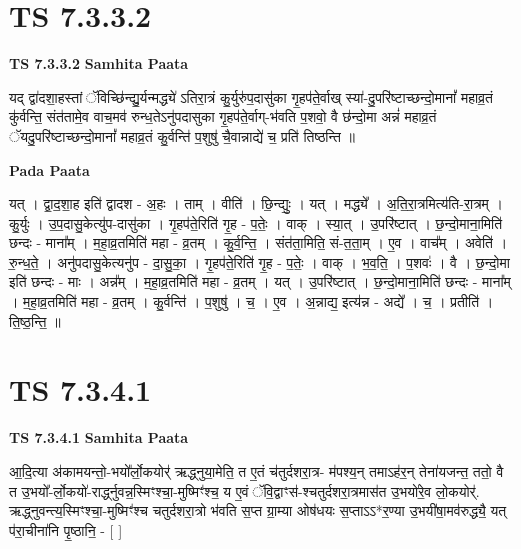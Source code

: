 \documentclass[17pt]{extarticle}
\begin{document}

\section{ TS 7.3.3.2 }

\textbf{TS 7.3.3.2 } \newline
\textbf{Samhita Paata} \newline

यद् द्वा॑दशा॒हस्तां ॅविच्छि॑न्द्यु॒र्यन्मद्ध्ये॑ ऽतिरा॒त्रं कु॒र्युरु॑प॒दासु॑का गृ॒हप॑ते॒र्वाख् स्या॑-दु॒परि॑ष्टाच्छन्दो॒मानां᳚ महाव्र॒तं कु॑र्वन्ति॒ संत॑तामे॒व वाच॒मव॑ रुन्ध॒तेऽनु॑पदासुका गृ॒हप॑ते॒र्वाग्-भ॑वति प॒शवो॒ वै छ॑न्दो॒मा अन्नं॑ महाव्र॒तं ॅयदु॒परि॑ष्टाच्छन्दो॒मानां᳚ महाव्र॒तं कु॒र्वन्ति॑ प॒शुषु॑ चै॒वान्नाद्ये॑ च॒ प्रति॑ तिष्ठन्ति ॥ \newline

\textbf{Pada Paata} \newline

यत् । द्वा॒द॒शा॒ह इति॑ द्वादश - अ॒हः । ताम् । वीति॑ । छि॒न्द्युः॒ । यत् । मद्ध्ये᳚ । अ॒ति॒रा॒त्रमित्य॑ति-रा॒त्रम् । कु॒र्युः । उ॒प॒दासु॒केत्यु॑प-दासु॑का । गृ॒हप॑ते॒रिति॑ गृ॒ह - प॒तेः॒ । वाक् । स्या॒त् । उ॒परि॑ष्टात् । छ॒न्दो॒माना॒मिति॑ छन्दः - माना᳚म् । म॒हा॒व्र॒तमिति॑ महा - व्र॒तम् । कु॒र्व॒न्ति॒ । संत॑ता॒मिति॒ सं-त॒ता॒म् । ए॒व । वाच᳚म् । अवेति॑ । रु॒न्ध॒ते॒ । अनु॑पदासु॒केत्यनु॑प - दा॒सु॒का॒ । गृ॒हप॑ते॒रिति॑ गृ॒ह - प॒तेः॒ । वाक् । भ॒व॒ति॒ । प॒शवः॑ । वै । छ॒न्दो॒मा इति॑ छन्दः - माः । अन्न᳚म् । म॒हा॒व्र॒तमिति॑ महा - व्र॒तम् । यत् । उ॒परि॑ष्टात् । छ॒न्दो॒माना॒मिति॑ छन्दः - माना᳚म् । म॒हा॒व्र॒तमिति॑ महा - व्र॒तम् । कु॒र्वन्ति॑ । प॒शुषु॑ । च॒ । ए॒व । अ॒न्नाद्य॒ इत्य॑न्न - अद्ये᳚ । च॒ । प्रतीति॑ । ति॒ष्ठ॒न्ति॒ ॥  \newline





\section{ TS 7.3.4.1 }

\textbf{TS 7.3.4.1 } \newline
\textbf{Samhita Paata} \newline

आ॒दि॒त्या अ॑कामयन्तो॒-भयो᳚र्लो॒कयोर्॑ ऋद्ध्नुया॒मेति॒ त ए॒तं च॑तुर्दशरा॒त्र- म॑पश्य॒न् तमाऽह॑र॒न् तेना॑यजन्त॒ ततो॒ वै त उ॒भयो᳚-र्लो॒कयो॑-रार्द्ध्नुवन्न॒स्मिꣳश्चा॒-मुष्मिꣳ॑श्च॒ य ए॒वं ॅवि॒द्वाꣳस॑-श्चतुर्दशरा॒त्रमास॑त उ॒भयो॑रे॒व लो॒कयोर्॑. ऋद्ध्नुवन्त्य॒स्मिꣳश्चा॒-मुष्मिꣳ॑श्च चतुर्दशरा॒त्रो भ॑वति स॒प्त ग्रा॒म्या ओष॑धयः स॒प्ताऽऽ*र॒ण्या उ॒भयी॑षा॒मव॑रुद्ध्यै॒ यत् प॑रा॒चीना॑नि पृ॒ष्ठानि॒ - [  ] \newline
\end{document}
